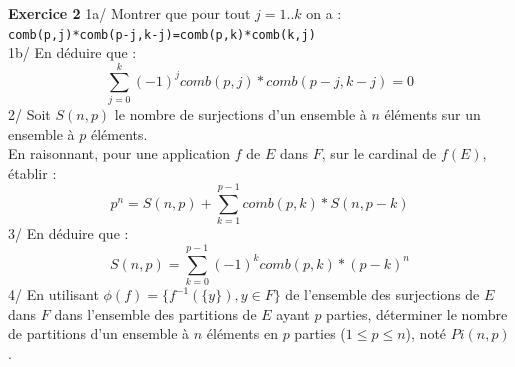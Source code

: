\documentclass[a4paper,11pt]{book}
\begin{document}
{\bf Exercice 2}
1a/ Montrer que  pour tout $j=1..k$ on a :\\
{\tt comb(p,j)*comb(p-j,k-j)=comb(p,k)*comb(k,j)}\\
1b/ En d\'eduire que :
$$\sum_{j=0}^k(-1)^jcomb(p,j)*comb(p-j,k-j)=0$$
2/ Soit $S(n,p)$ le nombre de surjections d’un ensemble \`a $n$ \'el\'ements 
sur un ensemble \`a $p$ \'el\'ements.\\
En raisonnant, pour une application $f$ de $E$ dans $F$, sur le cardinal de 
$f(E)$, \'etablir :
$$p^n=S(n,p)+\sum_{k=1}^{p-1}comb(p,k)*S(n,p-k)$$
3/ En d\'eduire que :
$$S(n,p)=\sum_{k=0}^{p-1}(-1)^kcomb(p,k)*(p-k)^n$$
4/ En utilisant $\phi(f) = \{f^{-1}(\{y\}) , y \in F \}$ de l’ensemble des 
surjections de $E$ dans $F$ dans l’ensemble des partitions de $E$ ayant $p$
parties, d\'eterminer le nombre de partitions
d’un ensemble \`a $n$ \'el\'ements en $p$ parties ($1 \leq p \leq n$), not\'e
$Pi(n,p)$.
\end{document}
